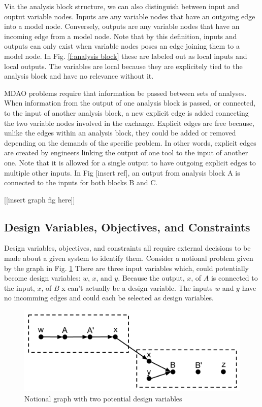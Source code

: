 Via the analysis block structure, we can also distinguish between input and ouptut
variable nodes. Inputs are any variable nodes that have an outgoing edge into a model 
node. Conversely, outputs are any variable nodes that have an incoming edge from a model node. 
Note that by this definition, inputs and outputs can only exist when variable nodes poses an 
edge joining them to a model node. In Fig. \ref{f:analysis block} these are labeled out as 
local inputs and local outputs. The variables are local because they are explicitely tied
to the analysis block and have no relevance without it. 

MDAO problems require that information be passed between sets of analyses. When information from the output of one analysis 
block is passed, or connected, to the input of another analysis block, a new explicit edge is added 
connecting the two variable nodes involved in the exchange. Explicit edges are free because, unlike the edges 
within an analysis block, they could be added or removed depending on the demands of the specific problem. 
In other words, explicit edges are created by engineers linking the output of one tool to the input 
of another one. Note that it is allowed for a single output to have outgoing explicit edges to multiple 
other inputs. In Fig [insert ref], an output from analysis block A is connected 
to the inputs for both blocks B and C. 

[[insert graph fig here]]

\subsection{Design Variables, Objectives, and Constraints}

Design variables, objectives, and constraints all require external decisions 
to be made about a given system to identify them. Consider 
a notional problem given by the graph in Fig. \ref{f:design vars} There are three input variables 
which, could potentially become design variables: $w$, $x$, and $y$. Because the output, $x$, of $A$
is connected to the input, $x$, of $B$ x can't actually be a design variable. The inputs $w$ and $y$
have no incomming edges and could each be selected as design variables. 

\begin{figure}[htb!]
  \begin{center}
    \includegraphics[width=.6\textwidth]{images/design_vars_graph}
  \end{center}
  \caption{Notional graph with two potential design variables \label{f:design vars}}
\end{figure}


